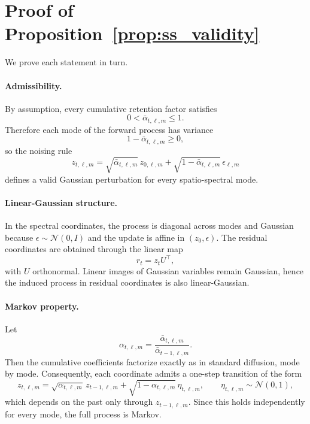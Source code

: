 \section{Proof of Proposition~\ref{prop:ss_validity}}

We prove each statement in turn.

\paragraph{Admissibility.}
By assumption, every cumulative retention factor satisfies
\[
0<\bar{\alpha}_{t,\ell,m}\leq 1.
\]
Therefore each mode of the forward process has variance
\[
1-\bar{\alpha}_{t,\ell,m}\geq 0,
\]
so the noising rule
\[
z_{t,\ell,m}
=
\sqrt{\bar{\alpha}_{t,\ell,m}}\,z_{0,\ell,m}
+
\sqrt{1-\bar{\alpha}_{t,\ell,m}}\,\epsilon_{\ell,m}
\]
defines a valid Gaussian perturbation for every spatio-spectral mode.

\paragraph{Linear-Gaussian structure.}
In the spectral coordinates, the process is diagonal across modes and Gaussian because $\epsilon\sim\mathcal{N}(0,I)$ and the update is affine in $(z_0,\epsilon)$. The residual coordinates are obtained through the linear map
\[
r_t = z_t U^\top,
\]
with $U$ orthonormal. Linear images of Gaussian variables remain Gaussian, hence the induced process in residual coordinates is also linear-Gaussian.

\paragraph{Markov property.}
Let
\[
\alpha_{t,\ell,m}
=
\frac{\bar{\alpha}_{t,\ell,m}}{\bar{\alpha}_{t-1,\ell,m}}.
\]
Then the cumulative coefficients factorize exactly as in standard diffusion, mode by mode. Consequently, each coordinate admits a one-step transition of the form
\[
z_{t,\ell,m}
=
\sqrt{\alpha_{t,\ell,m}}\,z_{t-1,\ell,m}
+
\sqrt{1-\alpha_{t,\ell,m}}\,\eta_{t,\ell,m},
\qquad
\eta_{t,\ell,m}\sim\mathcal{N}(0,1),
\]
which depends on the past only through $z_{t-1,\ell,m}$. Since this holds independently for every mode, the full process is Markov.

